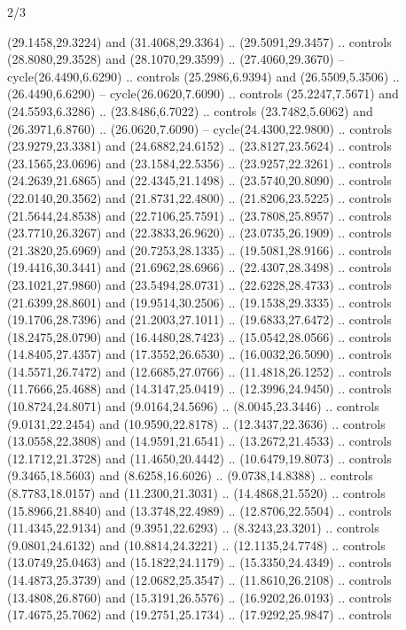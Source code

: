 \begin{flagdescription}{2/3}
\begin{scope}[yshift=\flagwidth,scale=\flagwidth/1241.93737]
\begin{scope}[y=-1mm, x=1mm,draw=gold,fill=blue,line join=miter,miter limit=4,line width=1.8\lw]
\begin{scope}[y=1mm, x=1mm, yscale=-1,shift={(573.68mm+\str,145.75)}]
\begin{scope}[scale=1.35,shift={(-9,-3)}]
\begin{scope}[scale=0.55]
\begin{scope}[scale=1.333]
    (29.1458,29.3224) and (31.4068,29.3364) .. (29.5091,29.3457) .. controls
    (28.8080,29.3528) and (28.1070,29.3599) .. (27.4060,29.3670) --
    cycle(26.4490,6.6290) .. controls (25.2986,6.9394) and (26.5509,5.3506) ..
    (26.4490,6.6290) -- cycle(26.0620,7.6090) .. controls (25.2247,7.5671) and
    (24.5593,6.3286) .. (23.8486,6.7022) .. controls (23.7482,5.6062) and
    (26.3971,6.8760) .. (26.0620,7.6090) -- cycle(24.4300,22.9800) .. controls
    (23.9279,23.3381) and (24.6882,24.6152) .. (23.8127,23.5624) .. controls
    (23.1565,23.0696) and (23.1584,22.5356) .. (23.9257,22.3261) .. controls
    (24.2639,21.6865) and (22.4345,21.1498) .. (23.5740,20.8090) .. controls
    (22.0140,20.3562) and (21.8731,22.4800) .. (21.8206,23.5225) .. controls
    (21.5644,24.8538) and (22.7106,25.7591) .. (23.7808,25.8957) .. controls
    (23.7710,26.3267) and (22.3833,26.9620) .. (23.0735,26.1909) .. controls
    (21.3820,25.6969) and (20.7253,28.1335) .. (19.5081,28.9166) .. controls
    (19.4416,30.3441) and (21.6962,28.6966) .. (22.4307,28.3498) .. controls
    (23.1021,27.9860) and (23.5494,28.0731) .. (22.6228,28.4733) .. controls
    (21.6399,28.8601) and (19.9514,30.2506) .. (19.1538,29.3335) .. controls
    (19.1706,28.7396) and (21.2003,27.1011) .. (19.6833,27.6472) .. controls
    (18.2475,28.0790) and (16.4480,28.7423) .. (15.0542,28.0566) .. controls
    (14.8405,27.4357) and (17.3552,26.6530) .. (16.0032,26.5090) .. controls
    (14.5571,26.7472) and (12.6685,27.0766) .. (11.4818,26.1252) .. controls
    (11.7666,25.4688) and (14.3147,25.0419) .. (12.3996,24.9450) .. controls
    (10.8724,24.8071) and (9.0164,24.5696) .. (8.0045,23.3446) .. controls
    (9.0131,22.2454) and (10.9590,22.8178) .. (12.3437,22.3636) .. controls
    (13.0558,22.3808) and (14.9591,21.6541) .. (13.2672,21.4533) .. controls
    (12.1712,21.3728) and (11.4650,20.4442) .. (10.6479,19.8073) .. controls
    (9.3465,18.5603) and (8.6258,16.6026) .. (9.0738,14.8388) .. controls
    (8.7783,18.0157) and (11.2300,21.3031) .. (14.4868,21.5520) .. controls
    (15.8966,21.8840) and (13.3748,22.4989) .. (12.8706,22.5504) .. controls
    (11.4345,22.9134) and (9.3951,22.6293) .. (8.3243,23.3201) .. controls
    (9.0801,24.6132) and (10.8814,24.3221) .. (12.1135,24.7748) .. controls
    (13.0749,25.0463) and (15.1822,24.1179) .. (15.3350,24.4349) .. controls
    (14.4873,25.3739) and (12.0682,25.3547) .. (11.8610,26.2108) .. controls
    (13.4808,26.8760) and (15.3191,26.5576) .. (16.9202,26.0193) .. controls
    (17.4675,25.7062) and (19.2751,25.1734) .. (17.9292,25.9847) .. controls

\end{scope}
\end{scope}
\end{scope}
\end{scope}
\end{scope}
\end{scope}
\end{flagdescription}

